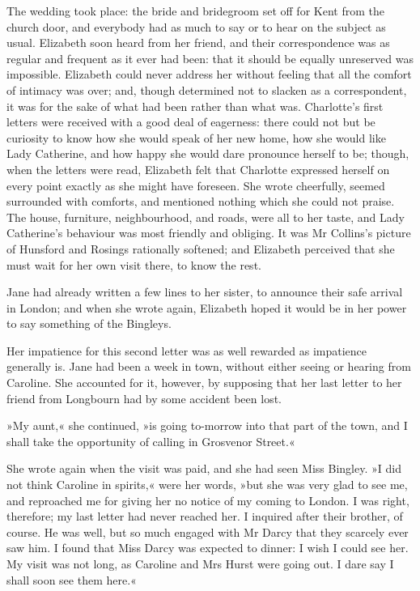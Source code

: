 The wedding took place: the bride and bridegroom set off for Kent from the church door, and everybody had as much to say or to hear on the subject as usual. Elizabeth soon heard from her friend, and their correspondence was as regular and frequent as it ever had been: that it should be equally unreserved was impossible. Elizabeth could never address her without feeling that all the comfort of intimacy was over; and, though determined not to slacken as a correspondent, it was for the sake of what had been rather than what was. Charlotte's first letters were received with a good deal of eagerness: there could not but be curiosity to know how she would speak of her new home, how she would like Lady Catherine, and how happy she would dare pronounce herself to be; though, when the letters were read, Elizabeth felt that Charlotte expressed herself on every point exactly as she might have foreseen. She wrote cheerfully, seemed surrounded with comforts, and mentioned nothing which she could not praise. The house, furniture, neighbourhood, and roads, were all to her taste, and Lady Catherine's behaviour was most friendly and obliging. It was Mr Collins's picture of Hunsford and Rosings rationally softened; and Elizabeth perceived that she must wait for her own visit there, to know the rest.

Jane had already written a few lines to her sister, to announce their safe arrival in London; and when she wrote again, Elizabeth hoped it would be in her power to say something of the Bingleys.

Her impatience for this second letter was as well rewarded as impatience generally is. Jane had been a week in town, without either seeing or hearing from Caroline. She accounted for it, however, by supposing that her last letter to her friend from Longbourn had by some accident been lost.

»My aunt,« she continued, »is going to-morrow into that part of the town, and I shall take the opportunity of calling in Grosvenor Street.«

She wrote again when the visit was paid, and she had seen Miss Bingley. »I did not think Caroline in spirits,« were her words, »but she was very glad to see me, and reproached me for giving her no notice of my coming to London. I was right, therefore; my last letter had never reached her. I inquired after their brother, of course. He was well, but so much engaged with Mr Darcy that they scarcely ever saw him. I found that Miss Darcy was expected to dinner: I wish I could see her. My visit was not long, as Caroline and Mrs Hurst were going out. I dare say I shall soon see them here.«

